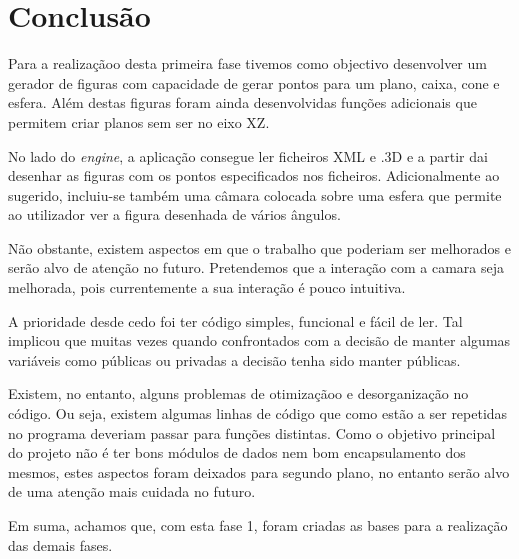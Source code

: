 \chapter{Conclusão}

Para a realizaçãoo desta primeira fase tivemos como objectivo desenvolver um gerador de figuras com capacidade de gerar pontos para um plano, caixa, cone e esfera.  Além destas figuras foram ainda desenvolvidas funções adicionais que permitem criar planos sem ser no eixo XZ. 

No lado do \textit{engine}, a aplicação consegue ler ficheiros XML e .3D e a partir dai desenhar as figuras com os pontos especificados nos ficheiros. Adicionalmente ao sugerido, incluiu-se também uma câmara colocada sobre uma esfera que permite ao utilizador ver a figura desenhada de vários ângulos. 


Não obstante, existem aspectos em que o trabalho que poderiam ser melhorados e serão alvo de atenção no futuro. Pretendemos que a interação com a camara seja melhorada, pois currentemente a sua interação é pouco intuitiva. 


A prioridade desde cedo foi ter código simples, funcional e fácil de ler. Tal implicou que muitas vezes quando confrontados com a decisão de manter algumas variáveis como públicas ou privadas a decisão tenha sido manter públicas. 



Existem, no entanto, alguns problemas de otimizaçãoo e desorganização
no código. Ou seja, existem algumas linhas de código que como estão a ser
repetidas no programa deveriam passar para funções distintas. 
Como o objetivo principal do projeto não é ter bons módulos de dados nem bom encapsulamento dos mesmos, estes aspectos foram deixados para segundo plano, no entanto serão alvo de uma atenção mais cuidada no futuro.

Em suma, achamos que, com esta fase 1, foram criadas as bases para a
realização das demais fases.
